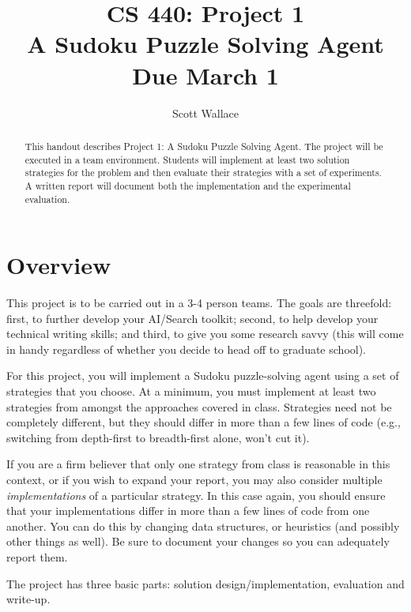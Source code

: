 \documentclass[letterpaper]{article}
\begin{document}
\title{CS 440: Project 1\\ A Sudoku Puzzle Solving Agent \\ Due
  March 1}
\author{Scott Wallace}

\maketitle

\begin{abstract}
This handout describes Project 1: A Sudoku Puzzle Solving Agent. The
project will be executed in a team environment. Students will
implement at least two solution strategies for the problem and then
evaluate their strategies with a set of experiments. A written report
will document both the implementation and the experimental evaluation.
\end{abstract}

\section{Overview}
This project is to be carried out in a 3-4 person teams.  The goals
are threefold: first, to further develop your AI/Search toolkit;
second, to help develop your technical writing skills; and third, to
give you some research savvy (this will come in handy regardless of
whether you decide to head off to graduate school).

For this project, you will implement a Sudoku puzzle-solving agent using a
set of strategies that you choose. At a minimum, you must implement
at least two strategies from amongst the approaches covered in class.
Strategies need not be completely different, but they should differ in
more than a few lines of code (e.g., switching from depth-first to
breadth-first alone, won't cut it). 

If you are a firm believer that
only one strategy from class is reasonable in this context, or if you
wish to expand your report, you may also consider multiple {\em
  implementations} of a particular strategy.  In this case again, you
should ensure that your implementations differ in more than a few
lines of code from one another.  You can do this by changing data
structures, or heuristics (and possibly other things as well). Be sure
to document your changes so you can adequately report them.

The project has three basic parts: solution design/implementation,
evaluation and write-up.
\end{document}
